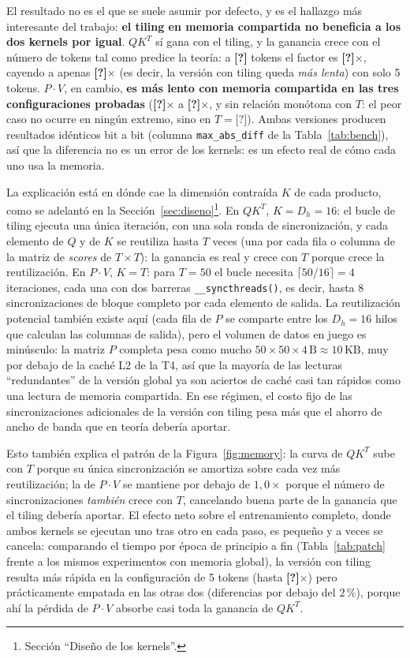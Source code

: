 \documentclass[11pt,a4paper]{article}
\providecommand{\KpiSpeedupTokensMax}{\textbf{[?]}}
\providecommand{\KpiSpeedupAtMax}{\textbf{[?]}}
\providecommand{\KpiSpeedupAtMin}{\textbf{[?]}}
\providecommand{\KpiEndToEndSpeedup}{\textbf{[?]}}
\providecommand{\KpiPxVSpeedupMin}{\textbf{[?]}}
\providecommand{\KpiPxVSpeedupMax}{\textbf{[?]}}
\providecommand{\KpiPxVSpeedupMinTokens}{\textbf{[?]}}
\begin{document}
El resultado no es el que se suele asumir por defecto, y es el hallazgo más
interesante del trabajo: \textbf{el tiling en memoria compartida no beneficia a
los dos kernels por igual}. $QK^{T}$ sí gana con el tiling, y la ganancia crece
con el número de tokens tal como predice la teoría: a
\KpiSpeedupTokensMax{} tokens el factor es \KpiSpeedupAtMax$\times$, cayendo a
apenas \KpiSpeedupAtMin$\times$ (es decir, la versión con tiling queda
\emph{más lenta}) con solo 5 tokens. $P\cdot V$, en cambio, \textbf{es más
lento con memoria compartida en las tres configuraciones probadas}
(\KpiPxVSpeedupMin$\times$ a \KpiPxVSpeedupMax$\times$, y sin relación monótona
con $T$: el peor caso no ocurre en ningún extremo, sino en
$T=\KpiPxVSpeedupMinTokens$). Ambas versiones producen
resultados idénticos bit a bit (columna \texttt{max\_abs\_diff} de la
Tabla~\ref{tab:bench}), así que la diferencia no es un error de los kernels:
es un efecto real de cómo cada uno usa la memoria.

La explicación está en dónde cae la dimensión contraída $K$ de cada producto,
como se adelantó en la Sección~\ref{sec:diseno}\footnote{Sección
``Diseño de los kernels''.}. En $QK^{T}$, $K = D_h = 16$: el bucle de tiling
ejecuta una única iteración, con una sola ronda de sincronización, y cada
elemento de $Q$ y de $K$ se reutiliza hasta $T$ veces (una por cada fila o
columna de la matriz de \emph{scores} de $T \times T$): la ganancia es real
y crece con $T$ porque crece la reutilización. En $P\cdot V$, $K = T$: para
$T=50$ el bucle necesita $\lceil 50/16 \rceil = 4$ iteraciones, cada una con dos
barreras \texttt{\_\_syncthreads()}, es decir, hasta 8 sincronizaciones de
bloque completo por cada elemento de salida. La reutilización potencial también
existe aquí (cada fila de $P$ se comparte entre los $D_h=16$ hilos que calculan
las columnas de salida), pero el volumen de datos en juego es minúsculo: la
matriz $P$ completa pesa como mucho $50\times50\times4\,\text{B} \approx
10\,\text{KB}$, muy por debajo de la caché L2 de la T4, así que la mayoría de
las lecturas ``redundantes'' de la versión global ya son aciertos de caché casi
tan rápidos como una lectura de memoria compartida. En ese régimen, el costo
fijo de las sincronizaciones adicionales de la versión con tiling pesa más que
el ahorro de ancho de banda que en teoría debería aportar.

Esto también explica el patrón de la Figura~\ref{fig:memory}: la curva de
$QK^{T}$ sube con $T$ porque su única sincronización se amortiza sobre cada vez
más reutilización; la de $P\cdot V$ se mantiene por debajo de $1{,}0\times$
porque el número de sincronizaciones \emph{también} crece con $T$, cancelando
buena parte de la ganancia que el tiling debería aportar. El efecto neto sobre
el entrenamiento completo, donde ambos kernels se ejecutan uno tras otro en
cada paso, es pequeño y a veces se cancela: comparando el tiempo por época de
principio a fin (Tabla~\ref{tab:patch} frente a los mismos experimentos con
memoria global), la versión con tiling resulta más rápida en la configuración
de 5 tokens (hasta \KpiEndToEndSpeedup$\times$) pero prácticamente empatada
en las otras dos (diferencias por debajo del $2$\,\%), porque ahí la pérdida de
$P\cdot V$ absorbe casi toda la ganancia de $QK^{T}$.
\end{document}
